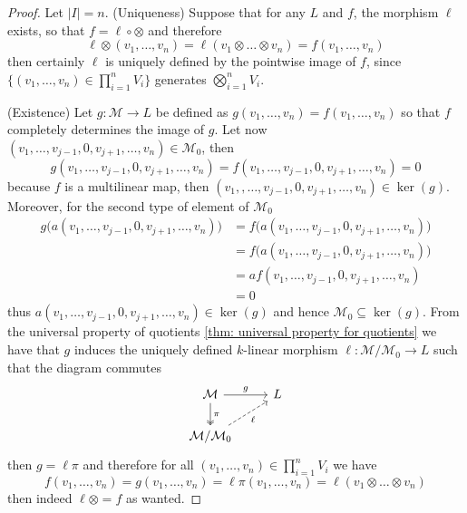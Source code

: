 \begin{proof}
  Let \(|I| = n\). (Uniqueness) Suppose that for any \(L\) and \(f\), the
  morphism \(\ell\) exists, so that \(f = \ell \circ \otimes\) and therefore
  \[
    \ell \otimes (v_1, \dots, v_n) = \ell(v_1 \otimes \dots \otimes v_n)
    = f(v_1, \dots, v_n)
  \]
  then certainly \(\ell\) is uniquely defined by the pointwise image of \(f\),
  since \(\{(v_1, \dots, v_n) \in \prod_{i=1}^n V_i\}\) generates
  \(\bigotimes_{i=1}^n V_i\).

  (Existence) Let \(g : \mathcal M \to L\) be defined as \(g(v_1, \dots, v_n) =
  f(v_1, \dots, v_n)\) so that \(f\) completely determines the image of \(g\).
  Let now \((v_1, \dots, v_{j-1}, 0, v_{j+1}, \dots, v_n) \in \mathcal M_0\),
  then
  \[
    g(v_1, \dots, v_{j-1}, 0, v_{j+1}, \dots, v_n)
    = f(v_1, \dots, v_{j-1}, 0, v_{j+1}, \dots, v_n) = 0
  \]
  because \(f\) is a multilinear map, then \((v_1,, \dots, v_{j-1}, 0, v_{j+1},
  \dots, v_n) \in \ker(g)\). Moreover, for the second type of element of
  \(\mathcal M_0\)
  \begin{align*}
    g\big(a(v_1, \dots, v_{j-1}, 0, v_{j+1}, \dots, v_n)\big)
    &= f\big(a(v_1, \dots, v_{j-1}, 0, v_{j+1}, \dots, v_n)\big) \\
    &= f\big(a(v_1, \dots, v_{j-1}, 0, v_{j+1}, \dots, v_n)\big) \\
    &= a f(v_1, \dots, v_{j-1}, 0, v_{j+1}, \dots, v_n) \\
    &= 0
  \end{align*}
  thus \(a(v_1, \dots, v_{j-1}, 0, v_{j+1}, \dots, v_n) \in \ker(g)\) and
  hence \(\mathcal M_0 \subseteq \ker(g)\). From the universal property of
  quotients \cref{thm: universal property for quotients} we have that \(g\)
  induces the uniquely defined \(k\)-linear morphism \(\ell: \mathcal M /
  \mathcal M_0 \to L\) such that the diagram commutes
  \[
    \begin{tikzcd}
      \mathcal M
      \ar[d, two heads, "\pi"]
      \ar[r, "g"]
        &L \\
      \mathcal M / \mathcal M_0
      \ar[ur, swap, dashed, "\ell"]
        &
    \end{tikzcd}
  \]
  then \(g = \ell \pi\) and therefore for all \((v_1, \dots, v_n) \in
  \prod_{i=1}^n V_i\) we have
  \[
    f(v_1, \dots, v_n)
    = g(v_1, \dots, v_n)
    = \ell \pi (v_1, \dots, v_n)
    = \ell(v_1 \otimes \dots \otimes v_n)
  \]
  then indeed \(\ell \otimes = f\) as wanted.
\end{proof}


